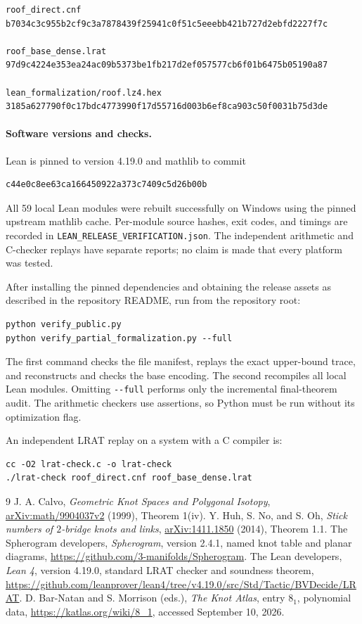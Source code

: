\documentclass[11pt]{article}
\newcommand{\code}[1]{\nolinkurl{#1}}
\begin{document}
\begingroup\footnotesize
\begin{verbatim}
roof_direct.cnf
b7034c3c955b2cf9c3a7878439f25941c0f51c5eeebb421b727d2ebfd2227f7c

roof_base_dense.lrat
97d9c4224e353ea24ac09b5373be1fb217d2ef057577cb6f01b6475b05190a87

lean_formalization/roof.lz4.hex
3185a627790f0c17bdc4773990f17d55716d003b6ef8ca903c50f0031b75d3de
\end{verbatim}
\endgroup

\paragraph{Software versions and checks.}
Lean is pinned to version 4.19.0 and mathlib to commit
\begin{verbatim}
c44e0c8ee63ca166450922a373c7409c5d26b00b
\end{verbatim}
All 59 local Lean modules were rebuilt successfully on Windows using
the pinned upstream mathlib cache. Per-module source hashes, exit codes,
and timings are recorded in \code{LEAN_RELEASE_VERIFICATION.json}.
The independent arithmetic and C-checker replays have separate reports;
no claim is made that every platform was tested.

After installing the pinned dependencies and obtaining the release assets
as described in the repository README, run from the repository root:
\begin{verbatim}
python verify_public.py
python verify_partial_formalization.py --full
\end{verbatim}
The first command checks the file manifest, replays the exact upper-bound
trace, and reconstructs and checks the base encoding. The second recompiles
all local Lean modules. Omitting \code{--full} performs only the incremental
final-theorem audit. The arithmetic checkers use assertions, so Python
must be run without its optimization flag.

An independent LRAT replay on a system with a C compiler is:
\begin{verbatim}
cc -O2 lrat-check.c -o lrat-check
./lrat-check roof_direct.cnf roof_base_dense.lrat
\end{verbatim}

\begin{thebibliography}{9}
 J. A. Calvo,
\emph{Geometric Knot Spaces and Polygonal Isotopy},
\href{https://arxiv.org/abs/math/9904037v2}{arXiv:math/9904037v2} (1999),
Theorem 1(iv).
 Y. Huh, S. No, and S. Oh,
\emph{Stick numbers of $2$-bridge knots and links},
\href{https://arxiv.org/abs/1411.1850}{arXiv:1411.1850} (2014),
Theorem 1.1.
 The Spherogram developers,
\emph{Spherogram}, version 2.4.1, named knot table and planar diagrams,
\url{https://github.com/3-manifolds/Spherogram}.
 The Lean developers,
\emph{Lean 4}, version 4.19.0, standard LRAT checker and soundness theorem,
\url{https://github.com/leanprover/lean4/tree/v4.19.0/src/Std/Tactic/BVDecide/LRAT}.
 D. Bar-Natan and S. Morrison (eds.),
\emph{The Knot Atlas}, entry $8_1$, polynomial data,
\url{https://katlas.org/wiki/8_1}, accessed September 10, 2026.
\end{thebibliography}
\end{document}
